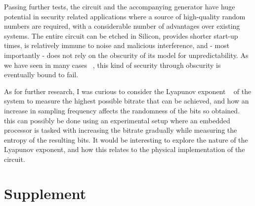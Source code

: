 \documentclass[jou,apacite]{apa6}
\begin{document}
Passing further tests, the circuit and the accompanying generator have huge potential in security related applications where a source of high-quality random numbers are required, with a considerable number of advantages over existing systems. The entire circuit can be etched in Silicon, provides shorter start-up times, is relatively immune to noise and malicious interference, and - most importantly - does not rely on the obscurity of its model for unpredictability. As we have seen in many cases ~\cite{knuth}, this kind of security through obscurity is eventually bound to fail.

As for further research, I was curious to consider the Lyapunov exponent ~\cite{lyap} of the system to measure the highest possible bitrate that can be achieved, and how an increase in sampling frequency affects the randomness of the bits so obtained. this can possibly be done using an experimental setup where an embedded processor is tasked with increasing the bitrate gradually while measuring the entropy of the resulting bits. It would be interesting to explore the nature of the Lyapunov exponent, and how this relates to the physical implementation of the circuit.



\newpage

\section{Supplement}
\end{document}
